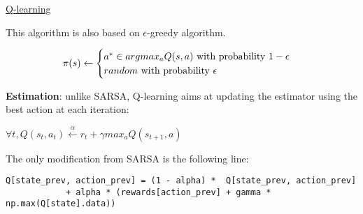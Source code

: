 \underline{Q-learning}

\vspace{5mm}

This algorithm is also based on $\epsilon$-greedy algorithm.

  \begin{equation}
 \pi(s) \leftarrow
    \begin{cases}
     a^* \in argmax_a Q(s,a) $ with probability $ 1-\epsilon \\
    random $ with probability $ \epsilon
    \end{cases}
  \end{equation}

\textbf{Estimation}: unlike SARSA, Q-learning aims at updating the estimator using the best action at each iteration:

\begin{center}
$\forall t, Q(s_t, a_t) \xleftarrow{\alpha} r_t + \gamma max_{a} Q(s_{t+1}, a)$
\end{center}

The only modification from SARSA is the following line:

\lstset{language=Python}
\lstset{frame=lines}
\lstset{basicstyle=\footnotesize}
\begin{lstlisting}
Q[state_prev, action_prev] = (1 - alpha) *  Q[state_prev, action_prev] 
			+ alpha * (rewards[action_prev] + gamma * np.max(Q[state].data))
\end{lstlisting}

\vspace{5mm}